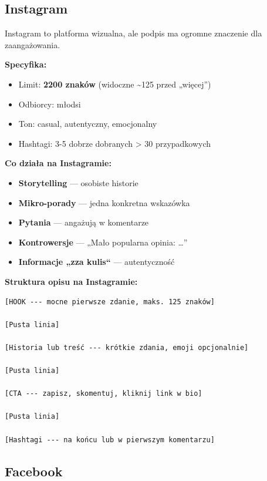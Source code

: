 \documentclass[
  12pt,
  a4paper,
  twoside,
  openright,
  12pt,
  DIV=12,
  BCOR=12mm]{scrbook}
\providecommand{\tightlist}{%
  \setlength{\itemsep}{0pt}\setlength{\parskip}{0pt}}\usepackage{longtable,booktabs,array}
\begin{document}
\subsection{Instagram}\label{instagram}

Instagram to platforma wizualna, ale podpis ma ogromne znaczenie dla
zaangażowania.

\textbf{Specyfika:}

\begin{itemize}
\tightlist
\item
  Limit: \textbf{2200 znaków} (widoczne \textasciitilde125 przed
  „więcej'')
\item
  Odbiorcy: młodsi
\item
  Ton: casual, autentyczny, emocjonalny
\item
  Hashtagi: 3-5 dobrze dobranych \textgreater{} 30 przypadkowych
\end{itemize}

\textbf{Co działa na Instagramie:}

\begin{itemize}
\tightlist
\item
  \textbf{Storytelling} --- osobiste historie
\item
  \textbf{Mikro-porady} --- jedna konkretna wskazówka
\item
  \textbf{Pytania} --- angażują w komentarze
\item
  \textbf{Kontrowersje} --- „Mało popularna opinia: \ldots''
\item
  \textbf{Informacje „zza kulis``} --- autentyczność
\end{itemize}

\textbf{Struktura opisu na Instagramie:}

\begin{verbatim}
[HOOK --- mocne pierwsze zdanie, maks. 125 znaków]

[Pusta linia]

[Historia lub treść --- krótkie zdania, emoji opcjonalnie]

[Pusta linia]

[CTA --- zapisz, skomentuj, kliknij link w bio]

[Pusta linia]

[Hashtagi --- na końcu lub w pierwszym komentarzu]
\end{verbatim}

\subsection{Facebook}\label{facebook}
\end{document}
